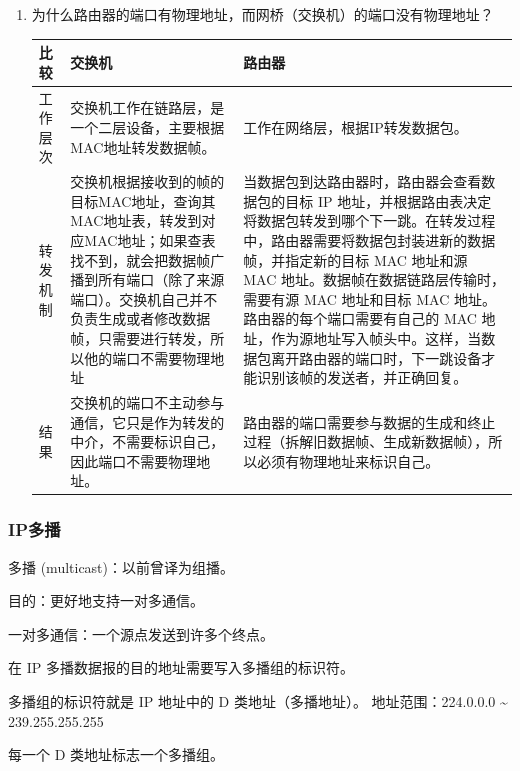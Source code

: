 \documentclass[11pt]{article}
\begin{document}
\begin{enumerate}
\begin{enumerate}
\begin{enumerate}
\begin{enumerate}
\begin{itemize}
\end{itemize}
\end{enumerate}
\item 为什么路由器的端口有物理地址，而网桥（交换机）的端口没有物理地址？
\label{sec:orgfca20e6}
\begin{center}
\begin{tabular}{lll}
比较 & 交换机 & 路由器\\[0pt]
\hline
工作层次 & 交换机工作在链路层，是一个二层设备，主要根据MAC地址转发数据帧。 & 工作在网络层，根据IP转发数据包。\\[0pt]
转发机制 & 交换机根据接收到的帧的目标MAC地址，查询其MAC地址表，转发到对应MAC地址；如果查表找不到，就会把数据帧广播到所有端口（除了来源端口）。交换机自己并不负责生成或者修改数据帧，只需要进行转发，所以他的端口不需要物理地址 & 当数据包到达路由器时，路由器会查看数据包的目标 IP 地址，并根据路由表决定将数据包转发到哪个下一跳。在转发过程中，路由器需要将数据包封装进新的数据帧，并指定新的目标 MAC 地址和源 MAC 地址。数据帧在数据链路层传输时，需要有源 MAC 地址和目标 MAC 地址。路由器的每个端口需要有自己的 MAC 地址，作为源地址写入帧头中。这样，当数据包离开路由器的端口时，下一跳设备才能识别该帧的发送者，并正确回复。\\[0pt]
结果 & 交换机的端口不主动参与通信，它只是作为转发的中介，不需要标识自己，因此端口不需要物理地址。 & 路由器的端口需要参与数据的生成和终止过程（拆解旧数据帧、生成新数据帧），所以必须有物理地址来标识自己。\\[0pt]
\end{tabular}
\end{center}
\end{enumerate}
\end{enumerate}
\end{enumerate}

\subsubsection{IP多播}
\label{sec:orgc7910ba}

多播 (multicast)：以前曾译为组播。

目的：更好地支持一对多通信。

一对多通信：一个源点发送到许多个终点。

在 IP 多播数据报的目的地址需要写入多播组的标识符。

多播组的标识符就是 IP 地址中的 D 类地址（多播地址）。
	地址范围：224.0.0.0 \textasciitilde{} 239.255.255.255

每一个 D 类地址标志一个多播组。
\end{document}

